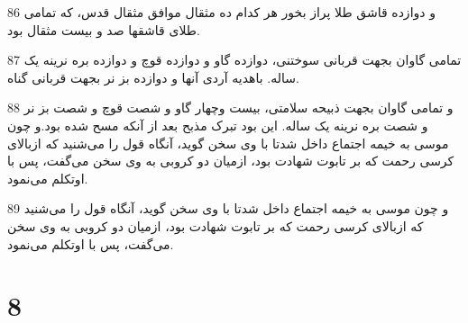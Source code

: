 \par 86 و دوازده قاشق طلا پراز بخور هر کدام ده مثقال موافق مثقال قدس، که تمامی طلای قاشقها صد و بیست مثقال بود.
\par 87 تمامی گاوان بجهت قربانی سوختنی، دوازده گاو و دوازده قوچ و دوازده بره نرینه یک ساله. باهدیه آردی آنها و دوازده بز نر بجهت قربانی گناه.
\par 88 و تمامی گاوان بجهت ذبیحه سلامتی، بیست وچهار گاو و شصت قوچ و شصت بز نر و شصت بره نرینه یک ساله. این بود تبرک مذبح بعد از آنکه مسح شده بود.و چون موسی به خیمه اجتماع داخل شدتا با وی سخن گوید، آنگاه قول را می‌شنید که ازبالای کرسی رحمت که بر تابوت شهادت بود، ازمیان دو کروبی به وی سخن می‌گفت، پس با اوتکلم می‌نمود.
\par 89 و چون موسی به خیمه اجتماع داخل شدتا با وی سخن گوید، آنگاه قول را می‌شنید که ازبالای کرسی رحمت که بر تابوت شهادت بود، ازمیان دو کروبی به وی سخن می‌گفت، پس با اوتکلم می‌نمود.
 
\chapter{8}


